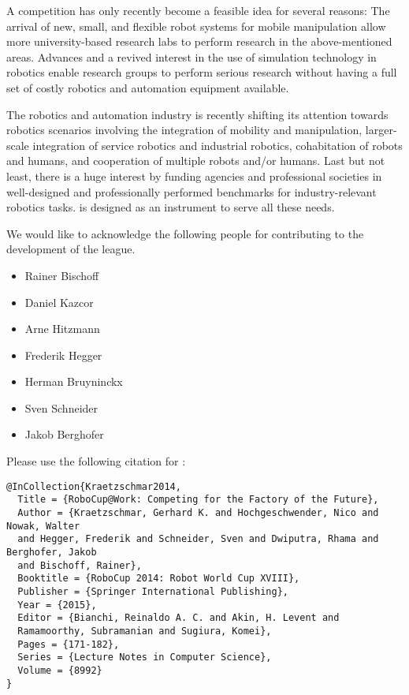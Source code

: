 A \RCAW competition has only recently become a feasible idea for several reasons: The arrival of new, small, and flexible robot systems for mobile manipulation allow more university-based research labs to perform research in the above-mentioned areas. Advances and a revived interest in the use of simulation technology in robotics enable research groups to perform serious research without having a full set of costly robotics and automation equipment available. 
\par

The robotics and automation industry is recently shifting its attention towards robotics scenarios involving the integration of mobility and manipulation, larger-scale integration of service robotics and industrial robotics, cohabitation of robots and humans, and cooperation of multiple robots and/or humans. Last but not least, there is a huge interest by funding agencies and professional societies in well-designed and professionally performed benchmarks for industry-relevant robotics tasks. \RCAW is designed as an instrument to serve all these needs.
\par 
We would like to acknowledge the following people for contributing to the development
of the \RCAW league. 

\begin{itemize}
	\item Rainer Bischoff
	\item Daniel Kazcor
	\item Arne Hitzmann
	\item Frederik Hegger
	\item Herman Bruyninckx
	\item Sven Schneider
	\item Jakob Berghofer
\end{itemize} 

Please use the following citation for \RCAW:
\begin{verbatim}
@InCollection{Kraetzschmar2014,
  Title = {RoboCup@Work: Competing for the Factory of the Future},
  Author = {Kraetzschmar, Gerhard K. and Hochgeschwender, Nico and Nowak, Walter 
  and Hegger, Frederik and Schneider, Sven and Dwiputra, Rhama and Berghofer, Jakob 
  and Bischoff, Rainer},
  Booktitle = {RoboCup 2014: Robot World Cup XVIII},
  Publisher = {Springer International Publishing},
  Year = {2015},
  Editor = {Bianchi, Reinaldo A. C. and Akin, H. Levent and 
  Ramamoorthy, Subramanian and Sugiura, Komei},
  Pages = {171-182},
  Series = {Lecture Notes in Computer Science},
  Volume = {8992}
}
\end{verbatim}
